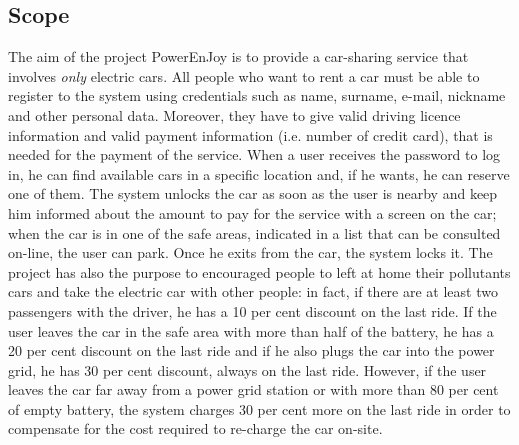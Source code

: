 \subsection{Scope} \label{subsec:scope}
The aim of the project %
PowerEnJoy is to provide a car-sharing service that involves \textit{only} electric cars. All people who want to %
rent a car must be able to register to the system using credentials such as name, surname, e-mail, nickname and other personal data. Moreover, they have to give valid driving licence information and valid payment information (i.e. number of credit card), that is needed %
for the payment
of the service. 
When a user receives the password to log in, he can find available cars in a specific location and, if he wants, he can reserve %
one of them. The system unlocks the car as soon as the user is nearby and keep him informed about the amount to pay for the service with a screen on the car; when the car is in one of the safe areas, indicated in a list that can be consulted on-line, the user can park. Once he exits from the car, the system locks it. The project has also the purpose to encouraged people to left at home their pollutants cars and take the electric car with other people: in fact, if there are at least two passengers with the driver, he has a 10 per cent discount on the last ride. If the user leaves the car in the safe area with more than half of the battery, he has a 20 per cent discount on the last ride and if he also plugs the car into the power grid, he has 30 per cent discount, always on the last ride. However, if the user leaves the car far away from a power grid station or with more than 80 per cent of empty battery, the system charges 30 per cent more on the last ride in order to compensate for the cost required to re-charge the car on-site.

